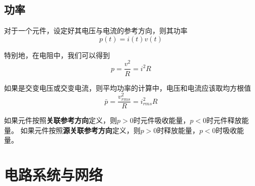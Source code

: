     \subsection{功率}
    \par 对于一个元件，设定好其电压与电流的参考方向，则其功率
    \[
    p(t)=i(t)v(t)    
    \]
    \par 特别地，在电阻中，我们可以得到
    \[
    p=\frac{v^2}{R}=i^2R    
    \]
    \par 如果是交变电压或交变电流，则平均功率的计算中，电压和电流应该取均方根值
    \[
    \bar{p}=\frac{v_{rms}^2}{R}=i_{rms}^2R    
    \]
    \par 如果元件按照\textbf{关联参考方向}定义，则$p>0$时元件吸收能量，$p<0$时元件释放能量。
    如果元件按照\textbf{源关联参考方向}定义，则$p>0$时释放能量，$p<0$时吸收能量。

    \section{电路系统与网络}
